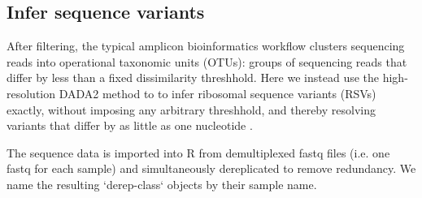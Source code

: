 \begin{knitrout}
\color{fgcolor}\begin{kframe}
\begin{alltt}
\hlstd{(}\hlopt{!}\hlstd{(} 
 \hlkwb{<-}  
 \hlkwb{<-}  
  
  \hlstd{(}
                    \hlstd{=}\hlstd{,} \hlstd{=}\hlstd{(}\hlstd{,} \hlstd{),}
                    \hlstd{=}\hlstd{,} \hlstd{=}\hlstd{,} \hlstd{=}\hlstd{,}
                    \hlstd{=}\hlstd{)}
\hlstd{\}}
\end{alltt}
\end{kframe}
\end{knitrout}

\subsection*{Infer sequence variants}
After filtering, the typical amplicon bioinformatics workflow clusters
sequencing reads into operational taxonomic units (OTUs): groups of
sequencing reads that differ by less than a fixed dissimilarity
threshhold. Here we instead use the high-resolution DADA2
method to to infer ribosomal sequence variants (RSVs) exactly, without imposing
any arbitrary threshhold, and thereby 
resolving variants that differ by as little as one nucleotide \cite{dada2}.

The sequence data is imported into R from demultiplexed fastq files (i.e. one
fastq for each sample) and simultaneously dereplicated to remove redundancy. We
name the resulting `derep-class` objects by their sample name.

\begin{knitrout}
\color{fgcolor}\begin{kframe}
\begin{alltt}
 \hlkwb{<-} 
 \hlkwb{<-} 
 \hlkwb{<-} \hlstd{(}\hlstd{(} \hlstd{), `[`,} \hlstd{)}
 \hlkwb{<-} 
 \hlkwb{<-} 
\end{alltt}
\end{kframe}
\end{knitrout}

